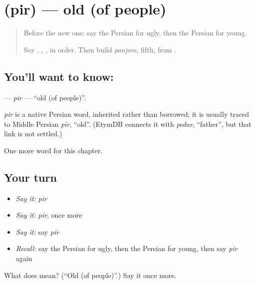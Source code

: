 \section[\texorpdfstring{\fa{پیر} (pir)}{پیر (pir)}]{ (pir) — old (of people)}

\label{lesson:FA-C125-pir}



\begin{quote}
Before the new one: say the Persian for ugly, then the Persian for young.

Say \textbf{}, \textbf{}, \textbf{}, \textbf{} in order. Then build \emph{panjom}, fifth, from \textbf{}.
\end{quote}

\subsection*{You'll want to know: }
\textbf{} — \emph{pir} — \textquotedblleft{}old (of people)\textquotedblright{}.

\begin{cousinweb}
\emph{pir} is a native Persian word, inherited rather than borrowed; it is usually traced to Middle Persian \emph{pīr}, \textquotedblleft{}old\textquotedblright{}. (EtymDB connects it with \emph{pedar}, \textquotedblleft{}father\textquotedblright{}, but that link is not settled.)
\end{cousinweb}

\begin{grammarlens}[title={What you've built}]
One more word for this chapter.
\end{grammarlens}

\subsection*{Your turn}
\begin{itemize}
\raggedright
  \item \emph{Say it:} \emph{pir}
  \item \emph{Say it:} \emph{pir}, once more
  \item \emph{Say it:} say \emph{pir}
  \item \emph{Recall:} say the Persian for ugly, then the Persian for young, then say \emph{pir} again
\end{itemize}

\begin{tcolorbox}[breakable,colback=teal!4,colframe=teal!35!black,title={Before you move on}]
What does  mean? (\textquotedblleft{}Old (of people)\textquotedblright{}.) Say it once more.
\end{tcolorbox}
